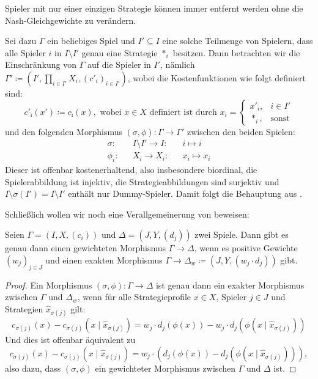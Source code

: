 \begin{bsp}\label{bsp:EinStratSpielerWeglassen}
	Spieler mit nur einer einzigen Strategie können immer entfernt werden ohne die Nash-Gleichgewichte zu verändern.
	
	Sei dazu $\Gamma$ ein beliebiges Spiel und $I' \subseteq I$ eine solche Teilmenge von Spielern, dass alle Spieler $i$ in $I \setminus I'$ genau eine Strategie $\ast_i$ besitzen. Dann betrachten wir die Einschränkung von $\Gamma$ auf die Spieler in $I'$, nämlich $\Gamma' \coloneqq (I', \prod_{i \in I'}X_i, (c'_i)_{i \in I'})$, wobei die Kostenfunktionen wie folgt definiert sind:
		\[c'_{\hat{\imath}}(x') \coloneqq c_{\hat{\imath}}(x), \text{ wobei $x \in X$ definiert ist durch } x_i = \begin{cases}x'_i, &i \in I'\\ \ast_i, &\text{sonst}\end{cases}\]
	und den folgenden Morphismus $(\sigma, \phi): \Gamma \to \Gamma'$ zwischen den beiden Spielen:
	\begin{align*}
		\sigma:	&&I\setminus I'	\to	 I:	&&i	\mapsto	i  \\
		\phi_i:	&&X_i	\to	 X_i:		&&x_i	\mapsto	x_i
	\end{align*}	
	Dieser ist offenbar kostenerhaltend, also insbesondere biordinal, die Spielerabbildung ist injektiv, die Strategieabbildungen sind surjektiv und $I\setminus \sigma(I') = I \setminus I'$ enthält nur Dummy-Spieler. Damit folgt die Behauptung aus .
\end{bsp}

Schließlich wollen wir noch eine Verallgemeinerung von  beweisen:

\begin{lemma}
	Seien $\Gamma = (I, X, (c_i))$ und $\Delta = (J, Y, (d_j))$ zwei Spiele. Dann gibt es genau dann einen gewichteten Morphismus $\Gamma \to \Delta$, wenn es positive Gewichte $(w_j)_{j\in J}$ und einen exakten Morphismus $\Gamma \to \Delta_w \coloneqq (J, Y, (w_j\cdot d_j))$ gibt.
\end{lemma}

\begin{proof}
	Ein Morphismus $(\sigma, \phi): \Gamma \to \Delta$ ist genau dann ein exakter Morphismus zwischen $\Gamma$ und $\Delta_w$, wenn für alle Strategieprofile $x \in X$, Spieler $j \in J$ und Strategien $\hat{x}_{\sigma(j)}$ gilt:
		\[c_{\sigma(j)}(x) - c_{\sigma(j)}(x \mid \hat{x}_{\sigma(j)}) = w_j \cdot d_j(\phi(x)) - w_j \cdot d_j(\phi(x \mid \hat{x}_{\sigma(j)}))\]
	Und dies ist offenbar äquivalent zu
		\[c_{\sigma(j)}(x) - c_{\sigma(j)}(x \mid \hat{x}_{\sigma(j)}) = w_j \cdot \left(d_j(\phi(x)) - d_j(\phi(x \mid \hat{x}_{\sigma(j)}))\right),\]
	also dazu, dass $(\sigma, \phi)$ ein gewichteter Morphismus zwischen $\Gamma$ und $\Delta$ ist.
\end{proof}